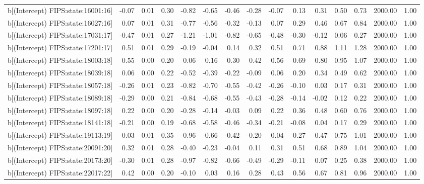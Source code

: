\begin{table}[ht]
\begin{tabular}{rrrrrrrrrrrrrrr}
  b[(Intercept) FIPS:state:16001:16] & -0.07 & 0.01 & 0.30 & -0.82 & -0.65 & -0.46 & -0.28 & -0.07 & 0.13 & 0.31 & 0.50 & 0.73 & 2000.00 & 1.00 \\ 
  b[(Intercept) FIPS:state:16027:16] & 0.07 & 0.01 & 0.31 & -0.77 & -0.56 & -0.32 & -0.13 & 0.07 & 0.29 & 0.46 & 0.67 & 0.84 & 2000.00 & 1.00 \\ 
  b[(Intercept) FIPS:state:17031:17] & -0.47 & 0.01 & 0.27 & -1.21 & -1.01 & -0.82 & -0.65 & -0.48 & -0.30 & -0.12 & 0.06 & 0.27 & 2000.00 & 1.00 \\ 
  b[(Intercept) FIPS:state:17201:17] & 0.51 & 0.01 & 0.29 & -0.19 & -0.04 & 0.14 & 0.32 & 0.51 & 0.71 & 0.88 & 1.11 & 1.28 & 2000.00 & 1.00 \\ 
  b[(Intercept) FIPS:state:18003:18] & 0.55 & 0.00 & 0.20 & 0.06 & 0.16 & 0.30 & 0.42 & 0.56 & 0.69 & 0.80 & 0.95 & 1.07 & 2000.00 & 1.00 \\ 
  b[(Intercept) FIPS:state:18039:18] & 0.06 & 0.00 & 0.22 & -0.52 & -0.39 & -0.22 & -0.09 & 0.06 & 0.20 & 0.34 & 0.49 & 0.62 & 2000.00 & 1.00 \\ 
  b[(Intercept) FIPS:state:18057:18] & -0.26 & 0.01 & 0.23 & -0.82 & -0.70 & -0.55 & -0.42 & -0.26 & -0.10 & 0.03 & 0.17 & 0.31 & 2000.00 & 1.00 \\ 
  b[(Intercept) FIPS:state:18089:18] & -0.29 & 0.00 & 0.21 & -0.84 & -0.68 & -0.55 & -0.43 & -0.28 & -0.14 & -0.02 & 0.12 & 0.22 & 2000.00 & 1.00 \\ 
  b[(Intercept) FIPS:state:18097:18] & 0.22 & 0.00 & 0.20 & -0.28 & -0.14 & -0.03 & 0.09 & 0.22 & 0.36 & 0.48 & 0.60 & 0.76 & 2000.00 & 1.00 \\ 
  b[(Intercept) FIPS:state:18141:18] & -0.21 & 0.00 & 0.19 & -0.68 & -0.58 & -0.46 & -0.34 & -0.21 & -0.08 & 0.04 & 0.17 & 0.29 & 2000.00 & 1.00 \\ 
  b[(Intercept) FIPS:state:19113:19] & 0.03 & 0.01 & 0.35 & -0.96 & -0.66 & -0.42 & -0.20 & 0.04 & 0.27 & 0.47 & 0.75 & 1.01 & 2000.00 & 1.00 \\ 
  b[(Intercept) FIPS:state:20091:20] & 0.32 & 0.01 & 0.28 & -0.40 & -0.23 & -0.04 & 0.11 & 0.31 & 0.51 & 0.68 & 0.89 & 1.04 & 2000.00 & 1.00 \\ 
  b[(Intercept) FIPS:state:20173:20] & -0.30 & 0.01 & 0.28 & -0.97 & -0.82 & -0.66 & -0.49 & -0.29 & -0.11 & 0.07 & 0.25 & 0.38 & 2000.00 & 1.00 \\ 
  b[(Intercept) FIPS:state:22017:22] & 0.42 & 0.00 & 0.20 & -0.10 & 0.03 & 0.16 & 0.28 & 0.43 & 0.56 & 0.67 & 0.81 & 0.96 & 2000.00 & 1.00 \\ 

\end{tabular}
\end{table}

